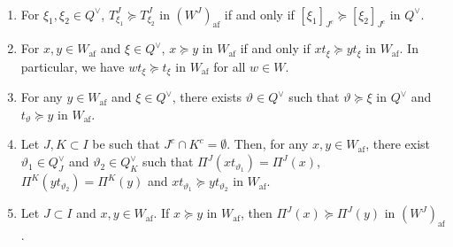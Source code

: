 \documentclass[ALCO,ThmDefs,Unicode,epreuves]{cedram}
\DeclareMathOperator{\af}{af}
\begin{document}
\begin{lemm} \label{lem:easy}\ \\[-1.2em]
\begin{enumerate}[label=(\arabic*)]
\item\label{Lemm3.9_1}
For $\xi_1 , \xi_2 \in Q^{\vee}$, 
$T^J_{\xi_1} \succeq T^J_{\xi_2}$ 
in 
$(W^J)_{\af}$
if and only if 
$[\xi_1]_{J^c} \succeq [\xi_2]_{J^c}$ 
in 
$Q^{\vee}$.
\item\label{Lemm3.9_2}
For 
$x , y \in W_{\af}$
and 
$\xi \in Q^{\vee}$, 
$x \succeq y$ 
in 
$W_{\af}$
if and only if
$x t_{\xi} \succeq yt_{\xi}$
in 
$W_{\af}$. 
In particular, we have 
$wt_{\xi} \succeq t_{\xi}$ 
in 
$W_{\af}$ 
for all 
$w \in W$.
\item\label{Lemm3.9_3}
For any 
$y \in W_{\af}$
and 
$\xi \in Q^{\vee}$, 
there exists 
$\vartheta \in Q^{\vee}$
such that 
$\vartheta \succeq \xi$ 
in 
$Q^{\vee}$
and 
$t_{\vartheta} \succeq y$
in 
$W_{\af}$.
\item\label{Lemm3.9_4}
Let 
$J,K \subset I$ 
be such that 
$J^c \cap K^c = \emptyset$. 
Then, 
for any 
$x , y \in W_{\af}$, 
there exist
$\vartheta_1 \in Q_J^{\vee}$ 
and 
$\vartheta_2 \in Q_K^{\vee}$
such that 
$\Pi^J(x t_{\vartheta_1}) = \Pi^{J}(x)$, 
$\Pi^K(y t_{\vartheta_2}) = \Pi^K(y)$ and 
$x t_{\vartheta_1} \succeq y t_{\vartheta_2}$
in
$W_{\af}$.
\item\label{Lemm3.9_5}
Let $J \subset I$ and $x , y \in W_{\af}$. 
If 
$x \succeq y$ in $W_{\af}$, 
then 
$\Pi^J(x) \succeq \Pi^J(y)$ in $(W^J)_{\af}$.
\end{enumerate}
\end{lemm}
\end{document}
